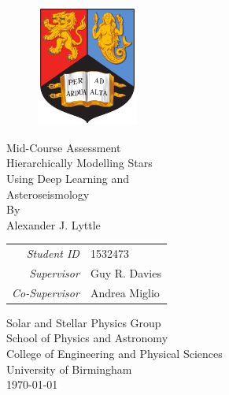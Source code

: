 \thispagestyle{empty}
\providecommand\pdfbookmark[3][]{} \pdfbookmark[0]{Title Page}{bm:Title}
\vspace*{1cm}
\begin{figure}[ht!]
    \centering
    \includegraphics[height=4cm]{frontmatter/images/BirminghamUniversityCrest.png}
\end{figure}
\vfill
\begin{center}
    {\large{Mid-Course Assessment}}\\[1.0em]
    {\huge{Hierarchically Modelling Stars}}\\[0.5em]
    {\huge{Using Deep Learning and}}\\[0.5em]
    {\huge{Asteroseismology}}\\[0.5em]
    \vfill
    By\\[\baselineskip]
    {\Large{Alexander J. Lyttle}}
    \vfill
    \begin{tabular}{rl}
        \emph{Student ID} & 1532473\\[-0.8em]
        \emph{Supervisor} & Guy R. Davies\\[-0.8em]
        \emph{Co-Supervisor} & Andrea Miglio\\[-0.8em] 
    \end{tabular}

\end{center}
\begin{center}
Solar and Stellar Physics Group\\[-0.8em]
School of Physics and Astronomy\\[-0.8em]
College of Engineering and Physical Sciences\\[-0.8em]
University of Birmingham\\[1.0em]
\today \\[\baselineskip]
\end{center}
\clearpage


